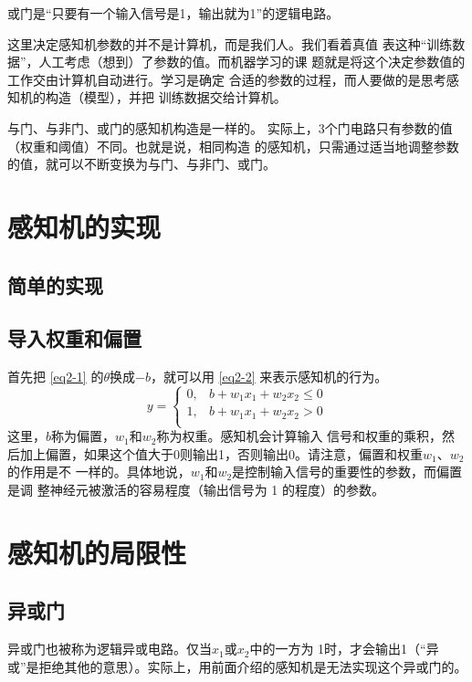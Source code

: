 或门是“只要有一个输入信号是1，输出就为1”的逻辑电路。

\begin{tcolorbox}
    这里决定感知机参数的并不是计算机，而是我们人。我们看着真值
    表这种“训练数据”，人工考虑（想到）了参数的值。而机器学习的课
    题就是将这个决定参数值的工作交由计算机自动进行。学习是确定
    合适的参数的过程，而人要做的是思考感知机的构造（模型），并把
    训练数据交给计算机。
\end{tcolorbox}

与门、与非门、或门的感知机构造是一样的。
实际上，3个门电路只有参数的值（权重和阈值）不同。也就是说，相同构造
的感知机，只需通过适当地调整参数的值，就可以不断变换为与门、与非门、或门。

\section{感知机的实现}
\subsection{简单的实现}
\subsection{导入权重和偏置}
首先把 \autoref{eq2-1} 的$\theta$换成$-b$，就可以用 \autoref{eq2-2} 来表示感知机的行为。
\begin{equation}
    \label{eq2-2}
    y = \left \{
    \begin{array}{ll}
        0, & b+w_1x_1+w_2x_2  \leq 0 \\
        1, & b+w_1x_1+w_2x_2 > 0     \\
    \end{array}
    \right.
\end{equation}
这里，$b$称为偏置，$w_1$和$w_2$称为权重。感知机会计算输入
信号和权重的乘积，然后加上偏置，如果这个值大于0则输出1，否则输出0。请注意，偏置和权重$w_1$、$w_2$的作用是不
一样的。具体地说，$w_1$和$w_2$是控制输入信号的重要性的参数，而偏置是调
整神经元被激活的容易程度（输出信号为 1 的程度）的参数。

\section{感知机的局限性}
\subsection{异或门}
异或门也被称为逻辑异或电路。仅当$x_1$或$x_2$中的一方为
1时，才会输出1（“异或”是拒绝其他的意思）。实际上，用前面介绍的感知机是无法实现这个异或门的。

